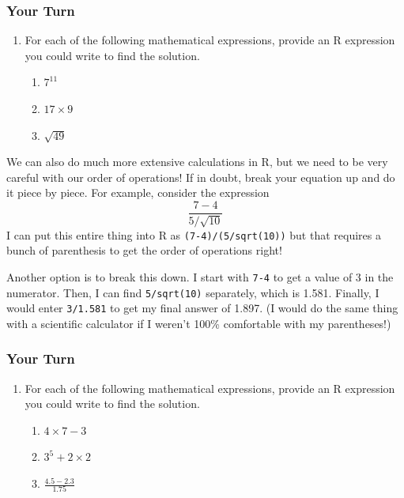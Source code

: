 \documentclass[
]{book}
\providecommand{\tightlist}{%
  \setlength{\itemsep}{0pt}\setlength{\parskip}{0pt}}
\begin{document}
\subsubsection*{Your Turn}\label{your-turn}

\begin{enumerate}
\def\labelenumi{\arabic{enumi}.}
\tightlist
\item
  For each of the following mathematical expressions, provide an R expression you could write to find the solution.

  \begin{enumerate}
  \def\labelenumii{\alph{enumii}.}
  \tightlist
  \item
    \(7^{11}\)
  \item
    \(17\times9\)
  \item
    \(\sqrt{49}\)
  \end{enumerate}
\end{enumerate}

We can also do much more extensive calculations in R, but we need to be very careful with our order of operations! If in doubt, break your equation up and do it piece by piece. For example, consider the expression \[\frac{7-4}{5/\sqrt{10}}\] I can put this entire thing into R as \texttt{(7-4)/(5/sqrt(10))} but that requires a bunch of parenthesis to get the order of operations right!

Another option is to break this down. I start with \texttt{7-4} to get a value of 3 in the numerator. Then, I can find \texttt{5/sqrt(10)} separately, which is 1.581. Finally, I would enter \texttt{3/1.581} to get my final answer of 1.897. (I would do the same thing with a scientific calculator if I weren't 100\% comfortable with my parentheses!)

\subsubsection*{Your Turn}\label{your-turn-1}

\begin{enumerate}
\def\labelenumi{\arabic{enumi}.}
\setcounter{enumi}{1}
\tightlist
\item
  For each of the following mathematical expressions, provide an R expression you could write to find the solution.

  \begin{enumerate}
  \def\labelenumii{\alph{enumii}.}
  \tightlist
  \item
    \(4\times 7 - 3\)
  \item
    \(3^5 + 2\times2\)
  \item
    \(\frac{4.5 - 2.3}{1.75}\)
  \end{enumerate}
\end{enumerate}
\end{document}

